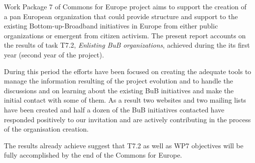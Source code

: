 Work Package 7 of Commons for Europe project aims to support the creation of a pan European organization that could provide structure and support to the existing Bottom-up-Broadband initiatives in Europe from either public organizations or emergent from citizen activism. The present report accounts on the results of task T7.2, \emph{Enlisting BuB organizations}, achieved during the its first year (second year of the project). 

During this period the efforts have been focused on creating the adequate tools to manage the information resulting of the project evolution and to handle the discussions and on learning about the existing BuB initiatives and make the initial contact with some of them. As a result two websites
and two mailing lists have been created and half a dozen of the BuB initiatives contacted have responded positively to our invitation and are actively contributing in the process of the organisation creation.

The results already achieve suggest that T7.2 as well as WP7 objectives will be fully accomplished by the end of the Commons for Europe.
